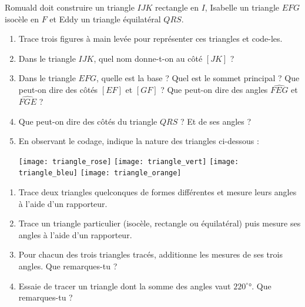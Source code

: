 \begin{activite}

Romuald doit construire un triangle $IJK$ rectangle en $I$, Isabelle un triangle $EFG$ isocèle en $F$ et Eddy un triangle équilatéral $QRS$.

\begin{enumerate}

\item Trace trois figures à main levée pour représenter ces triangles et code-les.

\vspace{4cm}
\item Dans le triangle $IJK$, quel nom donne-t-on au côté $[JK]$ ? \dotfill

\item Dans le triangle $EFG$, quelle est la base ? Quel est le sommet principal ? Que peut-on dire des côtés $[EF]$ et $[GF]$ ? Que peut-on dire des angles $\widehat{FEG}$ et $\widehat{FGE}$ ?  \dotfill

 \dotfill

\item Que peut-on dire des côtés du triangle $QRS$ ? Et de ses angles ?  \dotfill

\item En observant le codage, indique la nature des triangles ci-dessous :

\texttt{[image: triangle\_rose]} \hfill \texttt{[image: triangle\_vert]} \hfill \texttt{[image: triangle\_bleu]} \hfill \texttt{[image: triangle\_orange]}

\end{enumerate}

\end{activite}


\begin{activite}

\begin{enumerate}
\item Trace deux triangles quelconques de formes différentes et mesure leurs angles à l'aide d'un rapporteur.

\item Trace un triangle particulier (isocèle, rectangle ou équilatéral) puis mesure ses angles à l'aide d'un rapporteur.

\item Pour chacun des trois triangles tracés, additionne les mesures de ses trois angles. Que remarques-tu ?

\item Essaie de tracer un triangle dont la somme des angles vaut $220^\circ°$. Que remarques-tu ?
\end{enumerate}

\end{activite}

